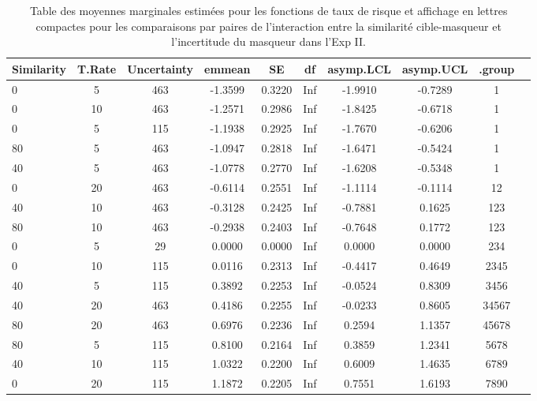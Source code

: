\begin{table}[!t]
\caption[Table des moyennes marginales estimées pour les fonctions de taux de risque pour l'Expérience~II]{Table des moyennes marginales estimées pour les fonctions de taux de risque et affichage en lettres compactes pour les comparaisons par paires de l'interaction entre la similarité cible-masqueur et l'incertitude du masqueur dans l'Exp II.} 
\label{tab:cld_Exp-II}
\footnotesize
\centering
\begin{tabular}{|l|*{9}{c|}}
\hline
\textbf{Similarity} & \textbf{T.Rate} & \textbf{Uncertainty} & \textbf{emmean} & \textbf{SE} & \textbf{df} & \textbf{asymp.LCL} & \textbf{asymp.UCL} & \textbf{.group} \\ 
\hline
0 & 5 & 463 & -1.3599 & 0.3220 & Inf & -1.9910 & -0.7289 & 1 \\ 
0 & 10 & 463 & -1.2571 & 0.2986 & Inf & -1.8425 & -0.6718 & 1 \\ 
0 & 5 & 115 & -1.1938 & 0.2925 & Inf & -1.7670 & -0.6206 & 1 \\ 
80 & 5 & 463 & -1.0947 & 0.2818 & Inf & -1.6471 & -0.5424 & 1 \\ 
40 & 5 & 463 & -1.0778 & 0.2770 & Inf & -1.6208 & -0.5348 & 1 \\ 
0 & 20 & 463 & -0.6114 & 0.2551 & Inf & -1.1114 & -0.1114 & 12 \\ 
40 & 10 & 463 & -0.3128 & 0.2425 & Inf & -0.7881 & 0.1625 & 123 \\ 
80 & 10 & 463 & -0.2938 & 0.2403 & Inf & -0.7648 & 0.1772 & 123 \\ 
0 & 5 & 29 & 0.0000 & 0.0000 & Inf & 0.0000 & 0.0000 & 234 \\ 
0 & 10 & 115 & 0.0116 & 0.2313 & Inf & -0.4417 & 0.4649 & 2345 \\ 
40 & 5 & 115 & 0.3892 & 0.2253 & Inf & -0.0524 & 0.8309 & 3456 \\ 
40 & 20 & 463 & 0.4186 & 0.2255 & Inf & -0.0233 & 0.8605 & 34567 \\ 
80 & 20 & 463 & 0.6976 & 0.2236 & Inf & 0.2594 & 1.1357 & 45678 \\ 
80 & 5 & 115 & 0.8100 & 0.2164 & Inf & 0.3859 & 1.2341 & 5678 \\ 
40 & 10 & 115 & 1.0322 & 0.2200 & Inf & 0.6009 & 1.4635 & 6789 \\ 
0 & 20 & 115 & 1.1872 & 0.2205 & Inf & 0.7551 & 1.6193 & 7890 \\ 

\end{tabular}
\end{table}
